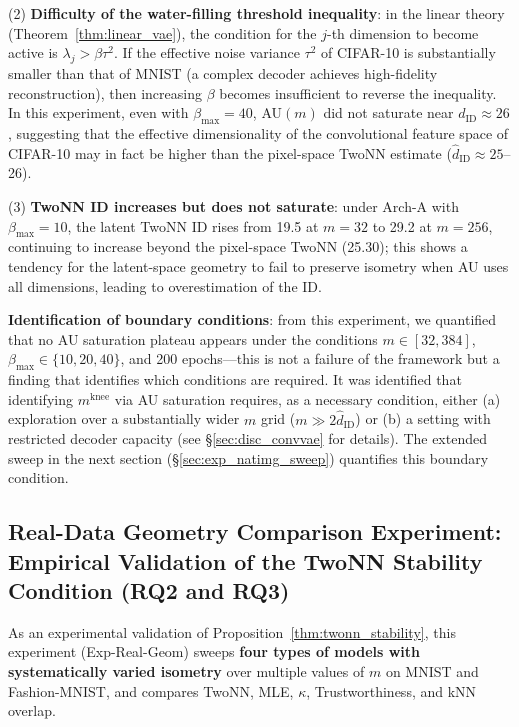 \documentclass[make,article,submit,pdftex,moreauthors]{Definitions/mdpi}
\newcommand{\kap}{\kappa}
\newcommand{\mknee}{m^{\mathrm{knee}}}
\begin{document}
(2) \textbf{Difficulty of the water-filling threshold inequality}:
in the linear theory (Theorem~\ref{thm:linear_vae}), the condition for the
$j$-th dimension to become active is $\lambda_j > \beta \tau^2$.
If the effective noise variance $\tau^2$ of CIFAR-10 is substantially smaller
than that of MNIST (a complex decoder achieves high-fidelity reconstruction),
then increasing $\beta$ becomes insufficient to reverse the inequality.
In this experiment, even with $\beta_{\max}=40$, AU$(m)$ did not saturate near
$d_{\mathrm{ID}} \approx 26$, suggesting that the effective dimensionality of
the convolutional feature space of CIFAR-10 may in fact be higher than the
pixel-space TwoNN estimate ($\hat{d}_{\mathrm{ID}} \approx 25$--26).

(3) \textbf{TwoNN ID increases but does not saturate}:
under Arch-A with $\beta_{\max}=10$, the latent TwoNN ID rises from 19.5 at
$m=32$ to 29.2 at $m=256$, continuing to increase beyond the pixel-space TwoNN
(25.30); this shows a tendency for the latent-space geometry to fail to
preserve isometry when AU uses all dimensions, leading to overestimation of
the ID.

\textbf{Identification of boundary conditions}: from this experiment, we
quantified that no AU saturation plateau appears under the conditions
$m \in [32, 384]$, $\beta_{\max} \in \{10, 20, 40\}$, and 200 epochs---this is
not a failure of the framework but a finding that identifies which conditions
are required.
It was identified that identifying $\mknee$ via AU saturation requires, as a
necessary condition, either (a) exploration over a substantially wider $m$
grid ($m \gg 2\hat{d}_\mathrm{ID}$) or (b) a setting with restricted decoder
capacity (see \S\ref{sec:disc_convvae} for details).
The extended sweep in the next section (\S\ref{sec:exp_natimg_sweep})
quantifies this boundary condition.

\subsection{Real-Data Geometry Comparison Experiment: Empirical Validation of the TwoNN Stability Condition (RQ2 and RQ3)}\label{sec:exp_real_geom}

As an experimental validation of Proposition~\ref{thm:twonn_stability},
this experiment (Exp-Real-Geom) sweeps \textbf{four types of models with
systematically varied isometry} over multiple values of $m$ on MNIST and
Fashion-MNIST, and compares TwoNN, MLE, $\kap$, Trustworthiness, and kNN
overlap.
\end{document}
